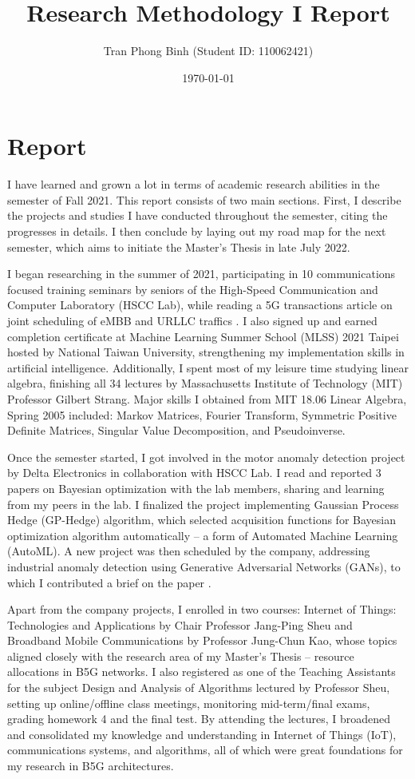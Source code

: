 \documentclass[12pt, a4paper, onside]{article}
\title{\textbf{Research Methodology I Report}}
\author{Tran Phong Binh (Student ID: 110062421)}
\affil{Advisor: Chair Professor Jang-Ping Sheu}
\date{\today}
\begin{document}
\maketitle

\section{Report}
I have learned and grown a lot in terms of academic research abilities in the semester of Fall 2021. This report consists of two main sections. First, I describe the projects and studies I have conducted throughout the semester, citing the progresses in details. I then conclude by laying out my road map for the next semester, which aims to initiate the Master's Thesis in late July 2022.

I began researching in the summer of 2021, participating in 10 communications focused training seminars by seniors of the High-Speed Communication and Computer Laboratory (HSCC Lab), while reading a 5G transactions article on joint scheduling of eMBB and URLLC traffics \cite{5gJointACM}. I also signed up and earned completion certificate at Machine Learning Summer School (MLSS) 2021 Taipei hosted by National Taiwan University, strengthening my implementation skills in artificial intelligence. Additionally, I spent most of my leisure time studying linear algebra, finishing all 34 lectures by Massachusetts Institute of Technology (MIT) Professor Gilbert Strang. Major skills I obtained from MIT 18.06 Linear Algebra, Spring 2005 included: Markov Matrices, Fourier Transform, Symmetric Positive Definite Matrices, Singular Value Decomposition, and Pseudoinverse.

Once the semester started, I got involved in the motor anomaly detection project by Delta Electronics in collaboration with HSCC Lab. I read and reported 3 papers on Bayesian optimization \cite{bayesPortfolio, bayesSearch, bayesBandit} with the lab members, sharing and learning from my peers in the lab. I finalized the project implementing Gaussian Process Hedge (GP-Hedge) algorithm, which selected acquisition functions for Bayesian optimization algorithm automatically -- a form of Automated Machine Learning (AutoML). A new project was then scheduled by the company, addressing industrial anomaly detection using Generative Adversarial Networks (GANs), to which I contributed a brief on the paper \cite{efficientGAN}.

Apart from the company projects, I enrolled in two courses: Internet of Things: Technologies and Applications by Chair Professor Jang-Ping Sheu and Broadband Mobile Communications by Professor Jung-Chun Kao, whose topics aligned closely with the research area of my Master's Thesis -- resource allocations in B5G networks. I also registered as one of the Teaching Assistants for the subject Design and Analysis of Algorithms lectured by Professor Sheu, setting up online/offline class meetings, monitoring mid-term/final exams, grading homework 4 and the final test. By attending the lectures, I broadened and consolidated my knowledge and understanding in Internet of Things (IoT), communications systems, and algorithms, all of which were great foundations for my research in B5G architectures.
\end{document}
